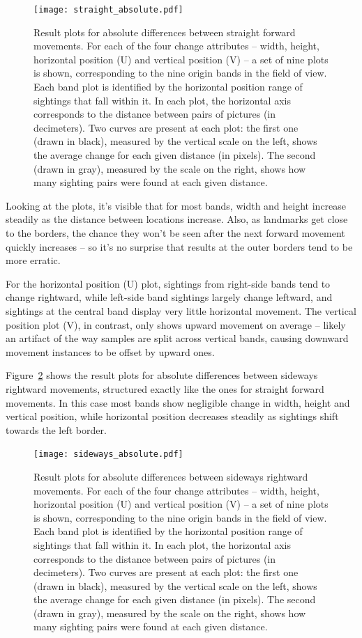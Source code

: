\documentclass[twocolumn, 9pt]{jsproceedings}
\begin{document}
\begin{figure}[h!]
\texttt{[image: straight\_absolute.pdf]}
\caption{Result plots for absolute differences between straight forward movements. For each of the four change attributes -- width, height, horizontal position (U) and vertical position (V) -- a set of nine plots is shown, corresponding to the nine origin bands in the field of view. Each band plot is identified by the horizontal position range of sightings that fall within it. In each plot, the horizontal axis corresponds to the distance between pairs of pictures (in decimeters). Two curves are present at each plot: the first one (drawn in black), measured by the vertical scale on the left, shows the average change for each given distance (in pixels). The second (drawn in gray), measured by the scale on the right, shows how many sighting pairs were found at each given distance.}
\label{fig:straight_absolute}
\end{figure}

Looking at the plots, it's visible that for most bands, width and height increase steadily as the distance between locations increase. Also, as landmarks get close to the borders, the chance they won't be seen after the next forward movement quickly increases -- so it's no surprise that results at the outer borders tend to be more erratic.

For the horizontal position (U) plot, sightings from right-side bands tend to change rightward, while left-side band sightings largely change leftward, and sightings at the central band display very little horizontal movement. The vertical position plot (V), in contrast, only shows upward movement on average -- likely an artifact of the way samples are split across vertical bands, causing downward movement instances to be offset by upward ones.

Figure~\ref{fig:sideways_absolute} shows the result plots for absolute differences between sideways rightward movements, structured exactly like the ones for straight forward movements. In this case most bands show negligible change in width, height and vertical position, while horizontal position decreases steadily as sightings shift towards the left border.

\begin{figure}[h!]
\texttt{[image: sideways\_absolute.pdf]}
\caption{Result plots for absolute differences between sideways rightward movements. For each of the four change attributes -- width, height, horizontal position (U) and vertical position (V) -- a set of nine plots is shown, corresponding to the nine origin bands in the field of view. Each band plot is identified by the horizontal position range of sightings that fall within it. In each plot, the horizontal axis corresponds to the distance between pairs of pictures (in decimeters). Two curves are present at each plot: the first one (drawn in black), measured by the vertical scale on the left, shows the average change for each given distance (in pixels). The second (drawn in gray), measured by the scale on the right, shows how many sighting pairs were found at each given distance.}
\label{fig:sideways_absolute}
\end{figure}
\end{document}
